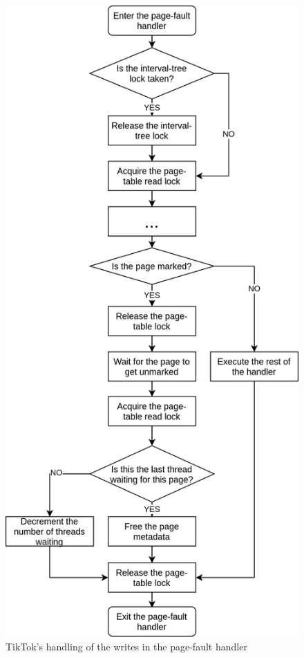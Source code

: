 \documentclass[conference]{IEEEtran}
\newcommand{\sysname}{TikTok}
\begin{document}
\begin{figure}[]
  \centering
  \includegraphics[width = 0.8\linewidth]{img/pagefault.png}
  \caption{\sysname's handling of the writes in the page-fault handler}
  \label{fig:pagefault}
\end{figure}
\end{document}
